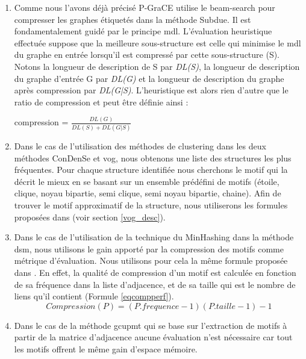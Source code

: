 \documentclass[a4paper,oneside,12pt]{report}
\theoremstyle{definition}
\begin{document}
		 \begin{enumerate}
		 \item Comme nous l'avons déjà précisé P-GraCE utilise le beam-search pour compresser les graphes étiquetés dans la méthode Subdue. Il est fondamentalement guidé par le principe \gls{mdl}. L'évaluation heuristique effectuée suppose que la meilleure sous-structure est celle qui minimise le \gls{mdl} du graphe en entrée lorsqu'il est compressé par cette sous-structure (S). Notons la longueur de description de S par \textit{DL(S)}, la longueur de description du graphe d'entrée G  par \textit{DL(G)} et la longueur de description du graphe après compression par \textit{DL(G|S)}. L'heuristique est alors rien d'autre que le ratio de compression et peut être définie ainsi :
		 
		\begin{center}
		compression = $\frac{DL(G)}{DL(S)+DL(G|S)} $
		\end{center}
		
		\item  Dans le cas de l'utilisation des méthodes de clustering dans les deux méthodes \gls{ConDenSe} et \gls{vog}, nous obtenons une liste des structures les plus fréquentes. Pour chaque structure identifiée nous cherchons le motif qui la décrit le mieux en se basant sur un ensemble prédéfini de motifs (étoile, clique, noyau bipartie, semi clique, semi noyau bipartie, chaine). Afin de trouver le motif approximatif de la structure, nous utiliserons les formules proposées dans \citep{koutra2015summarizing} (voir section \ref{vog_desc}).
		
		\item Dans le cas de l'utilisation de la technique du MinHashing dans la méthode \gls{dsm}, nous utilisons le gain apporté par la compression des motifs comme métrique d'évaluation. Nous utilisons pour cela la même formule proposée dans \citep{buehrer2008scalable}. En effet, la qualité de compression d'un motif est calculée en fonction de sa fréquence dans la liste d'adjacence, et de sa taille qui est le nombre de liens qu'il contient (Formule \ref{eqcompperf}).
				\begin{equation}
				Compression(P)=(P.frequence-1)(P.taille-1)-1
				\label{eqcompperf}
				\end{equation}
		\item Dans le cas de la méthode \gls{gcupmt} qui se base sur l'extraction de motifs à partir de la matrice d'adjacence aucune évaluation n'est nécessaire car tout les motifs offrent le même gain d'espace mémoire.
		 
		
		 \end{enumerate}
		 
\end{document}
